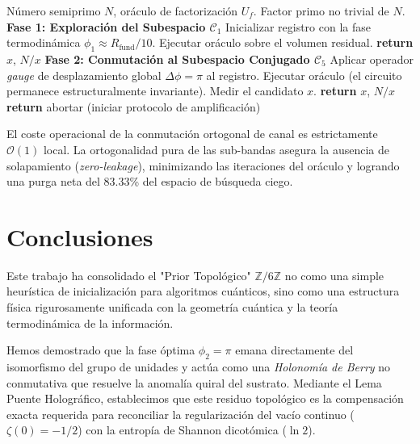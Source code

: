 \documentclass[12pt,a4paper]{article}
\theoremstyle{plain}
\theoremstyle{definition}
\theoremstyle{remark}
\begin{document}
\begin{algorithm}[H]
\caption{Estrategia Adaptativa de Búsqueda Modular (TSM)}
\label{alg:estrategia}
\begin{algorithmic}[1]
\Require Número semiprimo $N$, oráculo de factorización $U_f$.
\Ensure Factor primo no trivial de $N$.
\Statex
\State \textbf{Fase 1: Exploración del Subespacio $\mathcal{C}_1$}
\State Inicializar registro con la fase termodinámica $\phi_1 \approx R_{\text{fund}}/10$.
\State Ejecutar oráculo sobre el volumen residual.
    \State \textbf{return} $x$, $N/x$
\EndIf
\Statex
\State \textbf{Fase 2: Conmutación al Subespacio Conjugado $\mathcal{C}_5$}
\State Aplicar operador \textit{gauge} de desplazamiento global $\Delta\phi = \pi$ al registro.
\State Ejecutar oráculo (el circuito permanece estructuralmente invariante).
\State Medir el candidato $x$.
    \State \textbf{return} $x$, $N/x$
\Else
    \State \textbf{return} abortar (iniciar protocolo de amplificación)
\EndIf
\end{algorithmic}
\end{algorithm}

El coste operacional de la conmutación ortogonal de canal es estrictamente $\mathcal{O}(1)$ local. La ortogonalidad pura de las sub-bandas asegura la ausencia de solapamiento (\textit{zero-leakage}), minimizando las iteraciones del oráculo y logrando una purga neta del 83.33\% del espacio de búsqueda ciego.

\section{Conclusiones}

Este trabajo ha consolidado el "Prior Topológico" $\mathbb{Z}/6\mathbb{Z}$ no como una simple heurística de inicialización para algoritmos cuánticos, sino como una estructura física rigurosamente unificada con la geometría cuántica y la teoría termodinámica de la información. 

Hemos demostrado que la fase óptima $\phi_2 = \pi$ emana directamente del isomorfismo del grupo de unidades y actúa como una \textit{Holonomía de Berry} no conmutativa que resuelve la anomalía quiral del sustrato. Mediante el Lema Puente Holográfico, establecimos que este residuo topológico es la compensación exacta requerida para reconciliar la regularización del vacío continuo ($\zeta(0) = -1/2$) con la entropía de Shannon dicotómica ($\ln 2$). 
\end{document}
